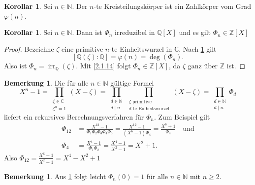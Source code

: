 \documentclass[
twoside=semi,
fontsize=12,
DIV=12, 
cleardoublepage=current,
leqno,
headings=optiontoheadandtoc, 
toc=idx
]{scrbook}
\newcommand{\N}{\mathbb{N}}
\newcommand{\Z}{\mathbb{Z}}
\newcommand{\Q}{\mathbb{Q}}
\newcommand{\C}{\mathbb{C}}
\DeclareMathOperator{\irr}{irr}
\theoremstyle{definition}
\newtheorem{bemerkung}[definition]{Bemerkung}
\newtheorem{korollar}[definition]{Korollar}
\begin{document}
 	\begin{korollar}\label{4.1.12}\hfill\newline
 		Sei $n \in \N$. Der $n$-te Kreisteilungsk\"orper ist ein Zahlk\"orper vom Grad $\varphi(n)$.
 	\end{korollar}
 
 	\begin{korollar}\label{4.1.13}\hfill\newline
 		Sei $n \in \N$. Dann ist $\Phi_n$ irreduzibel in $\Q[X]$ und es gilt $\Phi_n \in \Z[X]$
 		
 		\begin{proof}
 			Bezeichne $\zeta$ eine primitive $n$-te Einheitswurzel in $\C$. Nach \ref{4.1.12} gilt
 				\[[\Q(\zeta):\Q] = \varphi(n) = \deg(\Phi_n).\]
 			Also ist $\Phi_n = \irr_\Q(\zeta)$. Mit \ref{2.1.14} folgt $\Phi_n \in \Z[X]$, da $\zeta$ ganz \"uber $\Z$ ist.
 		\end{proof}
 	\end{korollar}
 	
 	\begin{bemerkung}\label{4.1.14}\hfill\newline
 		Die f\"ur alle $n \in \N$ g\"ultige Formel
 			\[X^n-1 = \prod_{\substack{\zeta \in \C\\\zeta^n = 1}}(X-\zeta) = \prod_{\substack{d \in \N\\ d\mid n}}\prod_{\substack{\zeta \textrm{ primitive}\\ d\textrm{-te Einheitswurzel}}}(X-\zeta) = \prod_{\substack{d \in \N\\d\mid n}}\Phi_d\]
 		liefert ein rekursives Berechnungsverfahren f\"ur $\Phi_n$. Zum Beispiel gilt
 		\begin{align*}
 			\Phi_{12} &= \frac{X^{12}-1}{\Phi_1\Phi_2\Phi_3\Phi_4\Phi_6} = \frac{X^{12}-1}{(X^6-1)\Phi_4} = \frac{X^6+1}{\Phi_4} \quad \textrm{und}\\
 			\Phi_4 &= \frac{X^4-1}{\Phi_1\Phi_2} = \frac{X^4-1}{X^2-1} = X^2+1.
 		\end{align*}
 		Also $\Phi_{12} = \frac{X^6+1}{X^2+1} = X^4-X^2+1$
 	\end{bemerkung}
 	
 	\begin{bemerkung}\label{4.1.15}\hfill\newline
 		Aus \ref{4.1.14} folgt leicht $\Phi_n(0) = 1$ f\"ur alle $n \in \N$ mit $n \geq 2$.
 	\end{bemerkung}
 
 	\newpage
\end{document}
